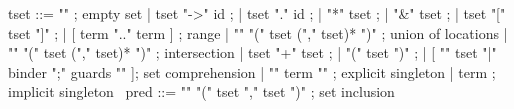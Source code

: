 \begin{syntax}
  tset ::= "\empty" ; empty set
       | tset "->" id ;
       | tset "." id ;
       | "*" tset ;
       | "&" tset ;
       | tset "[" tset "]" ;
       | [ term ".." term ] ; range
       | "\union" "(" tset ("," tset)* ")" ; union of locations
       | "\inter" "(" tset ("," tset)* ")" ; intersection
       | tset "+" tset ;
       | "(" tset ")" ;
       | [ "{" tset "|" binder ";" guards "}" ]; set comprehension
       | { "{" term "}" } ; explicit singleton
       | term ; implicit singleton
       \
  pred ::= {"\subset" "(" tset "," tset ")"} ; set inclusion
\end{syntax}
